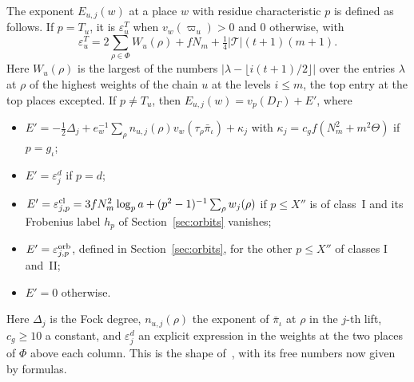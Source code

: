 \documentclass[reqno]{amsart}
\theoremstyle{definition}
\theoremstyle{plain}
\theoremstyle{remark}
\newcommand{\Tc}{\mathcal T}
\begin{document}
The exponent \(E_{u,j}(w)\) at a place \(w\) with residue characteristic \(p\) is defined as follows.  If \(p=T_u\), it is \(\varepsilon^T_u\) when \(v_w(\varpi_u)>0\) and \(0\) otherwise, with
\[
 \varepsilon^T_u=2\sum_{\rho\in\Phi}W_u(\rho)+fN_m+\tfrac14\lvert\Tc\rvert(t+1)(m+1).
\]
Here \(W_u(\rho)\) is the largest of the numbers \(\lvert\lambda-\lfloor i(t+1)/2\rfloor\rvert\) over the entries \(\lambda\) at \(\rho\) of the highest weights of the chain \(u\) at the levels \(i\le m\), the top entry at the top places excepted.  If \(p\ne T_u\), then \(E_{u,j}(w)=v_p(D_\Gamma)+E'\), where
\begin{itemize}
\item[] \(E'=-\tfrac12\Delta_j+e_w^{-1}\sum_\rho n_{u,j}(\rho)v_w(\tau_\rho\bar\pi_\iota)+\kappa_j\) with \(\kappa_j=c_gf(N_m^2+m^2\Theta)\) if \(p=g_\iota\);
\item[] \(E'=\varepsilon^d_j\) if \(p=d\);
\item[] \(E'=\varepsilon^{\rm cl}_{j,p}=3fN_m^2\log_pa+(p^2-1)^{-1}\sum_\rho w_j(\rho)\) if \(p\le X''\) is of class~I and its Frobenius label \(h_p\) of Section~\ref{sec:orbits} vanishes;
\item[] \(E'=\varepsilon^{\rm orb}_{j,p}\), defined in Section~\ref{sec:orbits}, for the other \(p\le X''\) of classes I and~II;
\item[] \(E'=0\) otherwise.
\end{itemize}
Here \(\Delta_j\) is the Fock degree, \(n_{u,j}(\rho)\) the exponent of \(\bar\pi_\iota\) at \(\rho\) in the \(j\)-th lift, \(c_g\ge10\) a constant, and \(\varepsilon^d_j\) an explicit expression in the weights at the two places of \(\Phi\) above each column.  This is the shape of~\cite[Def.~16.5]{Adr}, with its free numbers now given by formulas.
\end{document}
